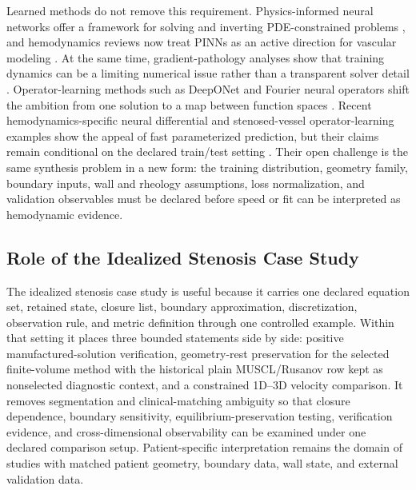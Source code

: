 Learned methods do not remove this requirement. Physics-informed neural networks
offer a framework for solving and inverting PDE-constrained problems
\cite{RaissiEtAl2019PhysicsInformedNeuralNetworks}, and hemodynamics reviews
now treat PINNs as an active direction for vascular modeling
\cite{YuEtAl2026PINNHemodynamicsReview}. At the same time, gradient-pathology
analyses show that training dynamics can be a limiting numerical issue rather
than a transparent solver detail
\cite{WangEtAl2021PINNGradientPathologies}. Operator-learning methods such as
DeepONet and Fourier neural operators shift the ambition from one solution to a
map between function spaces \cite{LuEtAl2021DeepONet,LiEtAl2021FNO}. Recent
hemodynamics-specific neural differential and stenosed-vessel operator-learning
examples show the appeal of fast parameterized prediction, but their claims
remain conditional on the declared train/test setting
\cite{CsalaEtAl2025PCNDE,VelikorodnyEtAl2025DeepOperatorStenosed}. Their open
challenge is the same synthesis problem in a new form: the training
distribution, geometry family, boundary inputs, wall and rheology assumptions,
loss normalization, and validation observables must be declared before speed or
fit can be interpreted as hemodynamic evidence.

\subsection{Role of the Idealized Stenosis Case Study}
\label{subsec:synthesis-idealized-stenosis-case-study}

The idealized stenosis case study is useful because it carries one declared
equation set, retained state, closure list, boundary approximation,
discretization, observation rule, and metric definition through one controlled
example. Within that setting it places three bounded statements side by side:
positive manufactured-solution verification, geometry-rest preservation for the
selected finite-volume method with the historical plain MUSCL/Rusanov row kept
as nonselected diagnostic context, and a constrained 1D--3D velocity comparison.
It removes segmentation and clinical-matching ambiguity so that closure
dependence, boundary sensitivity, equilibrium-preservation testing, verification
evidence, and cross-dimensional observability can be examined under one declared
comparison setup. Patient-specific interpretation remains the domain of studies
with matched patient geometry, boundary data, wall state, and external
validation data.
